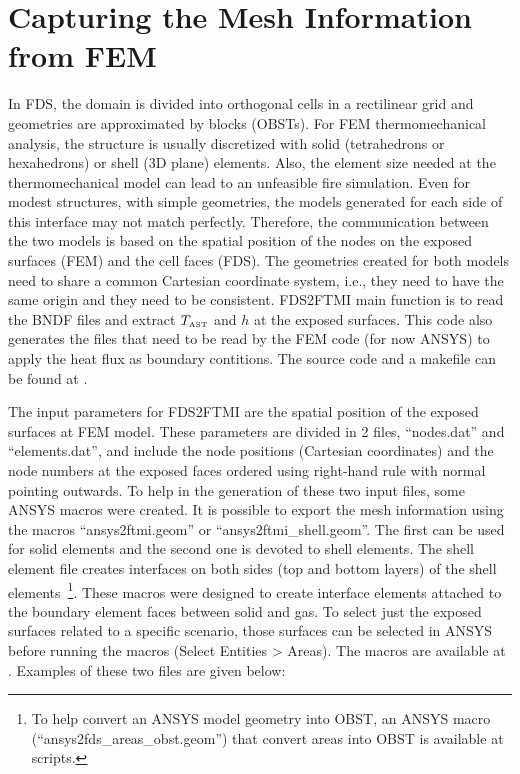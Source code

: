 \documentclass[11pt]{book}
\begin{document}
\section{Capturing the Mesh Information from FEM}

In FDS, the domain is divided into orthogonal cells in a rectilinear grid and geometries are approximated by blocks ({\ct OBST}s). For FEM thermomechanical analysis, the structure is usually discretized with solid (tetrahedrons or hexahedrons) or shell (3D plane) elements. Also, the element size needed at the thermomechanical model can lead to an unfeasible fire simulation. Even for modest structures, with simple geometries, the models generated for each side of this interface may not match perfectly. Therefore, the communication between the two models is based on the spatial position of the nodes on the exposed surfaces (FEM) and the cell faces (FDS). The geometries created for both models need to share a common Cartesian coordinate system, i.e., they need to have the same origin and they need to be consistent. FDS2FTMI main function is to read the {\ct BNDF} files and extract $T_{\hbox{\tiny AST}}$ and $h$ at the exposed surfaces. This code also generates the files that need to be read by the FEM code (for now A{\footnotesize NSYS}) to apply the heat flux as boundary contitions. The source code and a makefile can be found at . 

The input parameters for FDS2FTMI are the spatial position of the exposed surfaces at FEM model. These parameters are divided in 2 files, ``nodes.dat'' and ``elements.dat'', and include the node positions (Cartesian coordinates) and the node numbers at the exposed faces ordered using right-hand rule with normal pointing outwards. 
To help in the generation of these two input files, some A{\footnotesize NSYS} macros were created. It is possible to export the mesh information using the macros ``ansys2ftmi.geom'' or ``ansys2ftmi\_shell.geom''. 
The first can be used for solid elements and the second one is devoted to shell elements. The shell element file creates interfaces on both sides (top and bottom layers) of the shell elements~\footnote{To help convert an A{\footnotesize NSYS} model geometry into {\ct OBST}, an A{\footnotesize NSYS} macro (``ansys2fds\_areas\_obst.geom'') that convert areas into {\ct OBST} is available at scripts.}. These macros were designed to create interface elements attached to the boundary element faces between solid and gas. To select just the exposed surfaces related to a specific scenario, those surfaces can be selected in A{\footnotesize NSYS} before running the macros (Select Entities > Areas). The macros are available at . Examples of these two files are given below:
\end{document}
